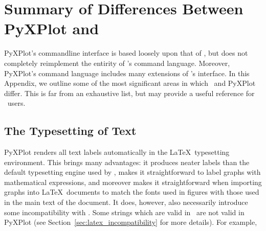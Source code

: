 %
%
%
%
%



\chapter{Summary of Differences Between PyXPlot and \gnuplot}
\label{ch:gnuplot_diffs}

PyXPlot's commandline interface is based loosely upon that of \gnuplot, but
does not completely reimplement the entirity of \gnuplot's command language.
Moreover, PyXPlot's command language includes many extensions of \gnuplot's
interface. In this Appendix, we outline some of the most significant areas in
which \gnuplot\ and PyXPlot differ. This is far from an exhaustive list, but
may provide a useful reference for \gnuplot\ users.

\section{The Typesetting of Text}

PyXPlot renders all text labels automatically in the \LaTeX\ typesetting
environment. This brings many advantages: it produces neater labels than the
default typesetting engine used by \gnuplot, makes it straightforward to label
graphs with mathematical expressions, and moreover makes it straightforward
when importing graphs into \LaTeX\ documents to match the fonts used in figures
with those used in the main text of the document.  It does, however, also
necessarily introduce some incompatibility with \gnuplot.  Some strings which
are valid in \gnuplot\ are not valid in PyXPlot (see
Section~\ref{sec:latex_incompatibility} for more details). For
example,

